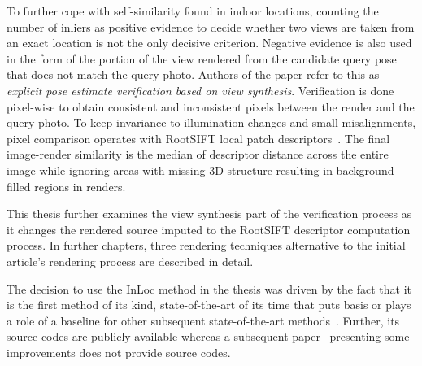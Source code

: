 To further cope with self-similarity found in indoor locations, counting the number of inliers
as positive evidence to decide whether two views are taken from an exact location is not the
only decisive criterion. Negative evidence is also used in the form of the portion of the view
rendered from the candidate query pose that does not match the query photo. Authors of the paper
refer to this as \emph{explicit pose estimate verification based on view synthesis}. Verification
is done pixel-wise to obtain consistent and inconsistent pixels between the render and the query photo.
To keep invariance to illumination changes and small misalignments, pixel comparison operates with RootSIFT
local patch descriptors~\citep{RootSIFT}. The final image-render similarity is the median of descriptor distance
across the entire image while ignoring areas with missing 3D structure resulting in background-filled regions in renders.

This thesis further examines the view synthesis part of the verification process as it changes the rendered source imputed
to the RootSIFT descriptor computation process. In further chapters, three rendering
techniques alternative to the initial article's rendering process are described in detail.

The decision to use the InLoc method in the thesis was driven by the fact that it is the first method of its kind,
state-of-the-art of its time that puts basis or plays a role of a baseline for
other subsequent state-of-the-art methods~\citep{PoseCorrection}. Further, its source codes are publicly
available whereas a subsequent paper~\citep{InLocRevisited}
presenting some improvements does not provide source codes.
